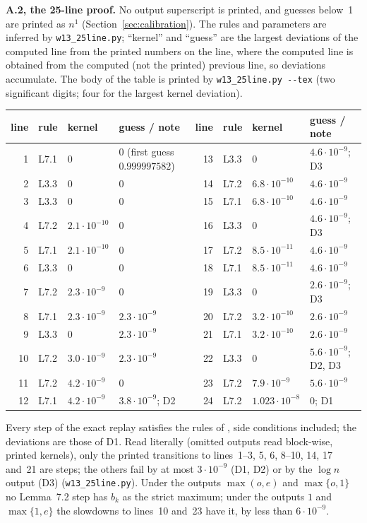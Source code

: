 \documentclass[11pt]{article}
\theoremstyle{definition}
\newcommand{\leanus}{\textunderscore\allowbreak}
\newcommand{\lean}[1]{\ifmmode\text{\ttfamily #1}\else{\ttfamily\let\_\leanus #1}\fi}
\begin{document}
\textbf{A.2, the 25-line proof.} No output superscript is printed, and guesses below~1 are printed as $n^1$ (Section~\ref{sec:calibration}). The rules and parameters are inferred by \texttt{w13\_25line.py}; ``kernel'' and ``guess'' are the largest deviations of the computed line from the printed numbers on the line, where the computed line is obtained from the computed (not the printed) previous line, so deviations accumulate. The body of the table is printed by \texttt{w13\_25line.py -{}-tex} (two significant digits; four for the largest kernel deviation).
\begin{center}\footnotesize
\begin{tabular}{rlll|rlll}
\toprule
line & rule & kernel & guess / note & line & rule & kernel & guess / note\\
\midrule
1 & L7.1 & 0 & 0 (first guess $0.999997582$) & 13 & L3.3 & 0 & $4.6\cdot10^{-9}$; D3\\
2 & L3.3 & 0 & 0 & 14 & L7.2 & $6.8\cdot10^{-10}$ & $4.6\cdot10^{-9}$\\
3 & L3.3 & 0 & 0 & 15 & L7.1 & $6.8\cdot10^{-10}$ & $4.6\cdot10^{-9}$\\
4 & L7.2 & $2.1\cdot10^{-10}$ & 0 & 16 & L3.3 & 0 & $4.6\cdot10^{-9}$; D3\\
5 & L7.1 & $2.1\cdot10^{-10}$ & 0 & 17 & L7.2 & $8.5\cdot10^{-11}$ & $4.6\cdot10^{-9}$\\
6 & L3.3 & 0 & 0 & 18 & L7.1 & $8.5\cdot10^{-11}$ & $4.6\cdot10^{-9}$\\
7 & L7.2 & $2.3\cdot10^{-9}$ & 0 & 19 & L3.3 & 0 & $2.6\cdot10^{-9}$; D3\\
8 & L7.1 & $2.3\cdot10^{-9}$ & $2.3\cdot10^{-9}$ & 20 & L7.2 & $3.2\cdot10^{-10}$ & $2.6\cdot10^{-9}$\\
9 & L3.3 & 0 & $2.3\cdot10^{-9}$ & 21 & L7.1 & $3.2\cdot10^{-10}$ & $2.6\cdot10^{-9}$\\
10 & L7.2 & $3.0\cdot10^{-9}$ & $2.3\cdot10^{-9}$ & 22 & L3.3 & 0 & $5.6\cdot10^{-9}$; D2, D3\\
11 & L7.2 & $4.2\cdot10^{-9}$ & 0 & 23 & L7.2 & $7.9\cdot10^{-9}$ & $5.6\cdot10^{-9}$\\
12 & L7.1 & $4.2\cdot10^{-9}$ & $3.8\cdot10^{-9}$; D2 & 24 & L7.2 & $1.023\cdot10^{-8}$ & 0; D1\\
\bottomrule
\end{tabular}
\end{center}
Every step of the exact replay satisfies the rules of \lean{HY.Step}, side conditions included; the deviations are those of D1. Read literally (omitted outputs read block-wise, printed kernels), only the printed transitions to lines~1--3, 5, 6, 8--10, 14, 17 and~21 are \lean{HL.RStep} steps; the others fail by at most $3\cdot10^{-9}$ (D1, D2) or by the $\log n$ output (D3) (\texttt{w13\_25line.py}). Under the outputs $\max(o,e)$ and $\max\{o,1\}$ no Lemma~7.2 step has $b_k$ as the strict maximum; under the outputs $1$ and $\max\{1,e\}$ the slowdowns to lines~10 and~23 have it, by less than $6\cdot10^{-9}$.
\end{document}
